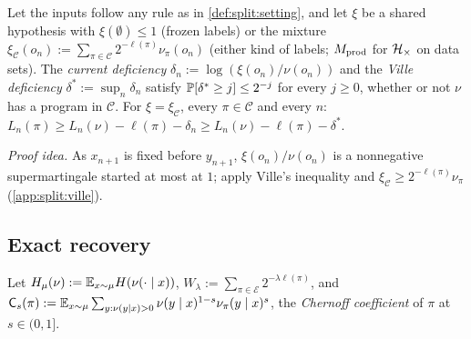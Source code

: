 \begin{lemma}\label{lem:split:ville}
Let the inputs follow any rule as in \cref{def:split:setting}, and let $\xi$ be a shared hypothesis with $\xi(\emptyset)\le1$ (frozen labels) or the mixture $\xi_{\mathcal C}(o_n):=\sum_{\pi\in\mathcal C}2^{-\ell(\pi)}\nu_\pi(o_n)$ (either kind of labels; $M_{\mathrm{prod}}$ for $\mathcal{H}_{\times}$ on data sets). The \emph{current deficiency} $\delta_n:=\log(\xi(o_n)/\nu(o_n))$ and the \emph{Ville deficiency} $\delta^*:=\sup_n\delta_n$ satisfy $\mathbb{P}[\delta^*\ge j]\le2^{-j}$ for every $j\ge0$, whether or not $\nu$ has a program in $\mathcal C$. For $\xi=\xi_{\mathcal C}$, every $\pi\in\mathcal C$ and every $n$: $L_n(\pi)\ge L_n(\nu)-\ell(\pi)-\delta_n\ge L_n(\nu)-\ell(\pi)-\delta^*$.
\end{lemma}

\emph{Proof idea.} As $x_{n+1}$ is fixed before $y_{n+1}$, $\xi(o_n)/\nu(o_n)$ is a nonnegative supermartingale started at most at $1$; apply Ville's inequality \citep{ville1939etude} and $\xi_{\mathcal C}\ge2^{-\ell(\pi)}\nu_\pi$ (\cref{app:split:ville}).

\subsection{Exact recovery}\label{sec:recovery:main}

Let $H_\mu(\nu):=\mathbb{E}_{x\sim\mu}H(\nu(\cdot\mid x))$, $W_\lambda:=\sum_{\pi\in\mathcal E}2^{-\lambda\ell(\pi)}$, and $\mathsf C_s(\pi):=\mathbb{E}_{x\sim\mu}\sum_{y:\nu(y\mid x)>0}\nu(y\mid x)^{1-s}\nu_\pi(y\mid x)^s$, the \emph{Chernoff coefficient} of $\pi$ at $s\in(0,1]$.

